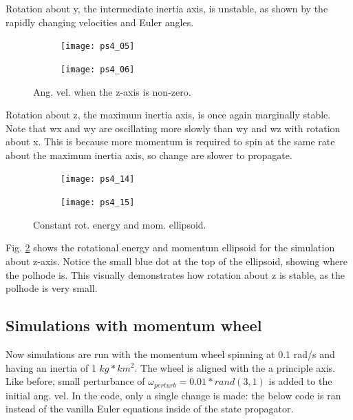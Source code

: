 \documentclass[12pt, letterpaper]{article}
\begin{document}
Rotation about y, the intermediate inertia axis, is unstable, as shown by the rapidly changing velocities and Euler angles.

\begin{figure}[H]
	\centering
	\begin{subfigure}[b]{0.49\textwidth}
		\texttt{[image: ps4\_05]}
	\end{subfigure}
	\begin{subfigure}[b]{0.49\textwidth}
		\texttt{[image: ps4\_06]}
	\end{subfigure}
	\caption{Ang. vel. when the z-axis is non-zero.}
	\label{(4:zangvel1)}
\end{figure}

Rotation about z, the maximum inertia axis, is once again marginally stable. Note that wx and wy are oscillating more slowly than wy and wz with rotation about x. This is because more momentum is required to spin at the same rate about the maximum inertia axis, so change are slower to propagate.


\begin{figure}[H]
	\centering
	\begin{subfigure}[b]{0.49\textwidth}
		\texttt{[image: ps4\_14]}
	\end{subfigure}
	\begin{subfigure}[b]{0.49\textwidth}
		\texttt{[image: ps4\_15]}
	\end{subfigure}
	\caption{Constant rot. energy and mom. ellipsoid.}
	\label{(4:pol1)}
\end{figure}

Fig. \ref{(4:pol1)} shows the rotational energy and momentum ellipsoid for the simulation about z-axis. Notice the small blue dot at the top of the ellipsoid, showing where the polhode is. This visually demonstrates how rotation about z is stable, as the polhode is very small.

\subsection{Simulations with momentum wheel}

Now simulations are run with the momentum wheel spinning at 0.1 rad/s and having an inertia of 1 $kg*km^2$. The wheel is aligned with the a principle axis. Like before, small perturbance of $\omega_{perturb} = 0.01*rand(3,1)$ is added to the initial ang. vel. In the code, only a single change is made: the below code is ran instead of the vanilla Euler equations inside of the state propagator.
\end{document}
